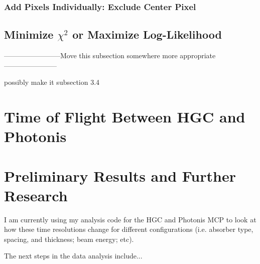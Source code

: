 \documentclass[12pt]{article}
\begin{document}
\subsubsection{Add Pixels Individually: Exclude Center Pixel}


\subsection{Minimize $\chi^2$ or Maximize Log-Likelihood}
------------------------Move this subsection somewhere more appropriate-----------------------

possibly make it subsection 3.4

\section{Time of Flight Between HGC and Photonis}

\section{Preliminary Results and Further Research}
I am currently using my analysis code for the HGC and Photonis MCP to look at how these time resolutions change for different configurations (i.e. absorber type, spacing, and thickness; beam energy; etc). 

The next steps in the data analysis include...
\end{document}
